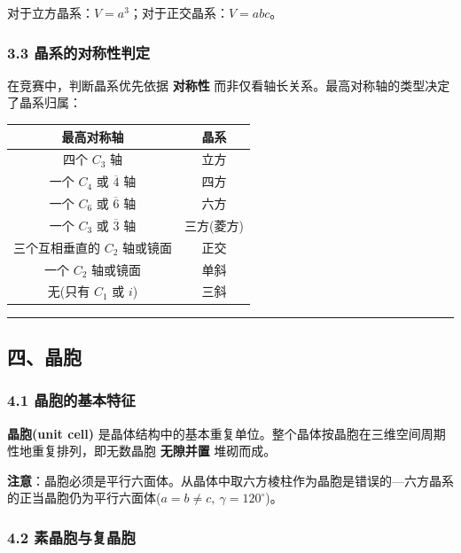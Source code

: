 \documentclass[a4paper,11pt]{ctexart}
\newcounter{none}
\newcommand{\箭}{\ensuremath{\rightarrow}}
\newcommand{\左箭}{\ensuremath{\leftarrow}}
\newcommand{\上箭}{\ensuremath{\uparrow}}
\newcommand{\下箭}{\ensuremath{\downarrow}}
\newcommand{\衡}{\ensuremath{\rightleftharpoons}}
\newcommand{\双箭}{\ensuremath{\leftrightarrow}}
\newcommand{\约等于}{\ensuremath{\approx}}
\newcommand{\小于等于}{\ensuremath{\leq}}
\newcommand{\大于等于}{\ensuremath{\geq}}
\newcommand{\不等于}{\ensuremath{\neq}}
\newcommand{\西格马}{\ensuremath{\sigma}}
\newcommand{\派}{\ensuremath{\pi}}
\begin{document}
对于立方晶系：\(V = a^3\)；对于正交晶系：\(V = abc\)。

\subsubsection{3.3 晶系的对称性判定}\label{ux6676ux7cfbux7684ux5bf9ux79f0ux6027ux5224ux5b9a}

在竞赛中，判断晶系优先依据 \textbf{对称性} 而非仅看轴长关系。最高对称轴的类型决定了晶系归属：

{\def\LTcaptype{none} %
\begin{longtable}[]{@{}cc@{}}
\toprule\noalign{}
最高对称轴 & 晶系 \\
\midrule\noalign{}
\endhead
\bottomrule\noalign{}
\endlastfoot
四个 \(C_3\) 轴 & 立方 \\
一个 \(C_4\) 或 \(\overline{4}\) 轴 & 四方 \\
一个 \(C_6\) 或 \(\overline{6}\) 轴 & 六方 \\
一个 \(C_3\) 或 \(\overline{3}\) 轴 & 三方(菱方) \\
三个互相垂直的 \(C_2\) 轴或镜面 & 正交 \\
一个 \(C_2\) 轴或镜面 & 单斜 \\
无(只有 \(C_1\) 或 \(i\)) & 三斜 \\
\end{longtable}
}

\begin{center}\rule{0.5\linewidth}{0.5pt}\end{center}

\subsection{四、晶胞}\label{ux56dbux6676ux80de}

\subsubsection{4.1 晶胞的基本特征}\label{ux6676ux80deux7684ux57faux672cux7279ux5f81}

\textbf{晶胞(unit cell)} 是晶体结构中的基本重复单位。整个晶体按晶胞在三维空间周期性地重复排列，即无数晶胞 \textbf{无隙并置} 堆砌而成。

\textbf{注意}：晶胞必须是平行六面体。从晶体中取六方棱柱作为晶胞是错误的---六方晶系的正当晶胞仍为平行六面体(\(a = b \neq c,\ \gamma = 120^\circ\))。

\subsubsection{4.2 素晶胞与复晶胞}\label{ux7d20ux6676ux80deux4e0eux590dux6676ux80de}
\end{document}
